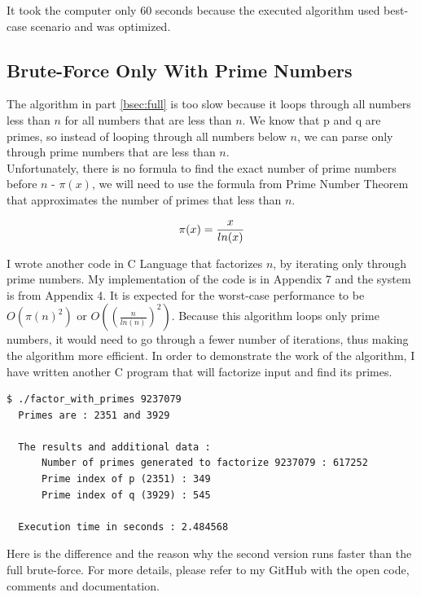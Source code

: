 \documentclass[a4paper, 12pt]{article}
\begin{document}
It took the computer only 60 seconds because the executed algorithm used best-case scenario and was optimized.\cite{github}

\subsection{Brute-Force Only With Prime Numbers}
\label{bsec:primes}

The algorithm in part \ref{bsec:full} is too slow because it loops through all numbers less than $n$ for all
numbers that are less than $n$. We know that p and q are primes, so instead of looping through all
numbers below $n$, we can parse only through prime numbers that are less than $n$.\\
Unfortunately, there is no formula to find the exact number of prime numbers before $n$ - $\pi(x)$, we will need to use
the formula from Prime Number Theorem that approximates the number of primes that less than $n$\cite{pi}.

\begin{equation}
  \pi(x)=\frac{x}{ln(x)}\\
  \end{equation}

I wrote another code in C\cite{Clang} Language that factorizes $n$, by iterating only through prime
numbers. My implementation of the code is in Appendix 7 and the system is from Appendix 4.
It is expected for the worst-case performance to be $O(\pi(n)^2)$ or $O((\frac{n}{ln(n)})^2)$.
Because this algorithm loops only prime
numbers, it would need to go through a fewer number of iterations, thus making the algorithm more efficient.
In order to demonstrate the work of the algorithm, I have written another C program that will factorize
input and find its primes.

\begin{lstlisting}[caption=Demonstration of Prime Factorization with Primes]
  $ ./factor_with_primes 9237079
  Primes are : 2351 and 3929

  The results and additional data :
      Number of primes generated to factorize 9237079 : 617252
      Prime index of p (2351) : 349
      Prime index of q (3929) : 545
      
  Execution time in seconds : 2.484568
  \end{lstlisting}

Here is the difference and the reason why the second version runs faster than the full brute-force.
For more details, please refer to my GitHub with the open code, comments and documentation. 
\end{document}
